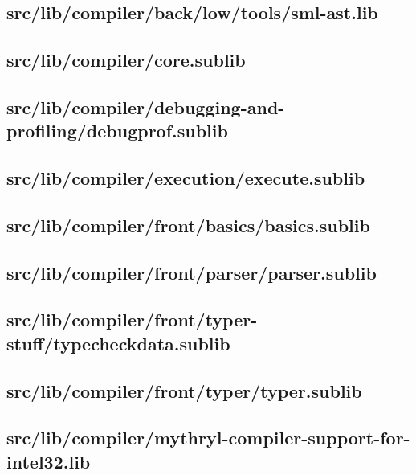 \subsection{src/lib/compiler/back/low/tools/sml-ast.lib}


\subsection{src/lib/compiler/core.sublib}


\subsection{src/lib/compiler/debugging-and-profiling/debugprof.sublib}


\subsection{src/lib/compiler/execution/execute.sublib}


\subsection{src/lib/compiler/front/basics/basics.sublib}


\subsection{src/lib/compiler/front/parser/parser.sublib}


\subsection{src/lib/compiler/front/typer-stuff/typecheckdata.sublib}


\subsection{src/lib/compiler/front/typer/typer.sublib}


\subsection{src/lib/compiler/mythryl-compiler-support-for-intel32.lib}


